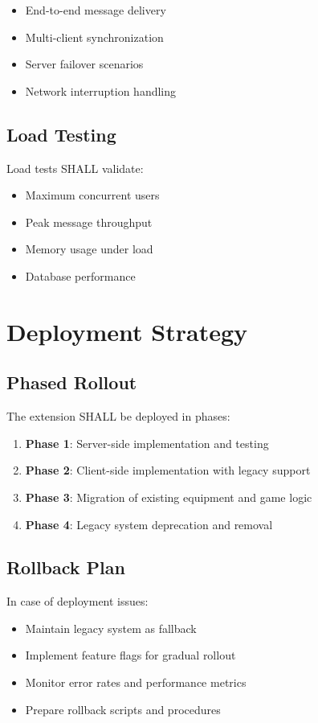 \documentclass[12pt,a4paper]{article}
\begin{document}
\begin{itemize}
\item End-to-end message delivery
\item Multi-client synchronization
\item Server failover scenarios
\item Network interruption handling
\end{itemize}

\subsection{Load Testing}

Load tests SHALL validate:

\begin{itemize}
\item Maximum concurrent users
\item Peak message throughput
\item Memory usage under load
\item Database performance
\end{itemize}

\section{Deployment Strategy}

\subsection{Phased Rollout}

The extension SHALL be deployed in phases:

\begin{enumerate}
\item \textbf{Phase 1}: Server-side implementation and testing
\item \textbf{Phase 2}: Client-side implementation with legacy support
\item \textbf{Phase 3}: Migration of existing equipment and game logic
\item \textbf{Phase 4}: Legacy system deprecation and removal
\end{enumerate}

\subsection{Rollback Plan}

In case of deployment issues:

\begin{itemize}
\item Maintain legacy system as fallback
\item Implement feature flags for gradual rollout
\item Monitor error rates and performance metrics
\item Prepare rollback scripts and procedures
\end{itemize}
\end{document}
